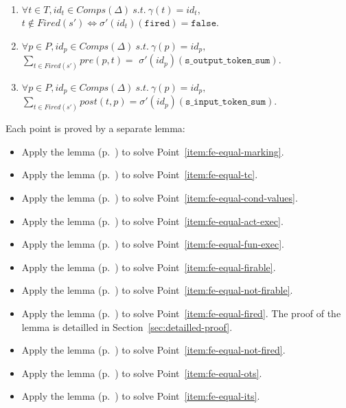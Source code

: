 \documentclass[dvipsnames,12pt]{article}
\begin{document}
\begin{niproof}
\begin{frameb}
\begin{enumerate}
    \item
      $\forall{}t\in{}T,id_t\in{}Comps(\Delta)~s.t.~\gamma(t)=id_t,$
      $t\notin{}Fired(s')\Leftrightarrow\sigma'(id_t)(\texttt{fired})=\mathtt{false}$.\label{item:fe-equal-not-fired}
    \item
      $\forall{}p\in{}P,id_p\in{}Comps(\Delta)~s.t.~\gamma(p)=id_p,$\\
      $\sum\limits_{t\in{}Fired(s')}pre(p,t)=$
      $\sigma'(id_p)(\texttt{s\_output\_token\_sum})$.\label{item:fe-equal-ots}
    \item
      $\forall{}p\in{}P,id_p\in{}Comps(\Delta)~s.t.~\gamma(p)=id_p,$\\
      $\sum\limits_{t\in{}Fired(s')}post(t,p)=\sigma'(id_p)(\texttt{s\_input\_token\_sum})$.\label{item:fe-equal-its}
    \end{enumerate}
  \end{frameb}

  Each point is proved by a separate lemma:
  \begin{itemize}[label=--]
  \item Apply the  lemma
    (p.~\pageref{lem:fe-equal-marking}) to solve
    Point~\ref{item:fe-equal-marking}.
  \item Apply the  lemma
    (p.~\pageref{lem:fe-equal-tc}) to solve
    Point~\ref{item:fe-equal-tc}.
  \item Apply the  lemma
    (p.~\pageref{lem:fe-equal-cond-values}) to solve
    Point~\ref{item:fe-equal-cond-values}.
  \item Apply the  lemma
    (p.~\pageref{lem:fe-equal-act-exec}) to solve
    Point~\ref{item:fe-equal-act-exec}.
  \item Apply the  lemma
    (p.~\pageref{lem:fe-equal-fun-exec}) to solve
    Point~\ref{item:fe-equal-fun-exec}.
  \item Apply the  lemma
    (p.~\pageref{lem:fe-equal-firable}) to solve
    Point~\ref{item:fe-equal-firable}.
  \item Apply the  lemma
    (p.~\pageref{lem:fe-equal-not-firable}) to solve
    Point~\ref{item:fe-equal-not-firable}.
  \item Apply the  lemma
    (p.~\pageref{lem:fe-equal-fired}) to solve
    Point~\ref{item:fe-equal-fired}. The proof of the
     lemma is detailled in
    Section~\ref{sec:detailled-proof}.
  \item Apply the  lemma
    (p.~\pageref{lem:fe-equal-not-fired}) to solve
    Point~\ref{item:fe-equal-not-fired}.
  \item Apply the  lemma
    (p.~\pageref{lem:fe-equal-ots}) to solve
    Point~\ref{item:fe-equal-ots}.
  \item Apply the  lemma
    (p.~\pageref{lem:fe-equal-its}) to solve
    Point~\ref{item:fe-equal-its}.
  \end{itemize}


\end{niproof}
\end{document}
